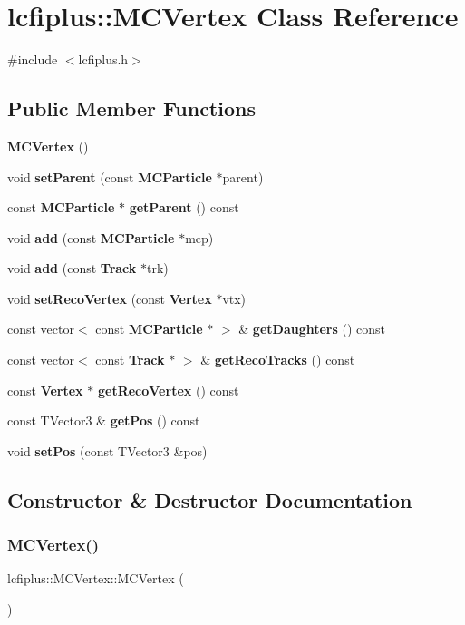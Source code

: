 \section{lcfiplus\+:\+:M\+C\+Vertex Class Reference}
\label{classlcfiplus_1_1MCVertex}


{\ttfamily \#include $<$lcfiplus.\+h$>$}

\subsection*{Public Member Functions}
\begin{DoxyCompactItemize}
\item 
\textbf{ M\+C\+Vertex} ()
\item 
void \textbf{ set\+Parent} (const \textbf{ M\+C\+Particle} $\ast$parent)
\item 
const \textbf{ M\+C\+Particle} $\ast$ \textbf{ get\+Parent} () const
\item 
void \textbf{ add} (const \textbf{ M\+C\+Particle} $\ast$mcp)
\item 
void \textbf{ add} (const \textbf{ Track} $\ast$trk)
\item 
void \textbf{ set\+Reco\+Vertex} (const \textbf{ Vertex} $\ast$vtx)
\item 
const vector$<$ const \textbf{ M\+C\+Particle} $\ast$ $>$ \& \textbf{ get\+Daughters} () const
\item 
const vector$<$ const \textbf{ Track} $\ast$ $>$ \& \textbf{ get\+Reco\+Tracks} () const
\item 
const \textbf{ Vertex} $\ast$ \textbf{ get\+Reco\+Vertex} () const
\item 
const T\+Vector3 \& \textbf{ get\+Pos} () const
\item 
void \textbf{ set\+Pos} (const T\+Vector3 \&pos)
\end{DoxyCompactItemize}


\subsection{Constructor \& Destructor Documentation}
\mbox{\label{classlcfiplus_1_1MCVertex_afdda54c20f1759eb4d914ffea108c738}} 
\subsubsection{M\+C\+Vertex()}
{\footnotesize\ttfamily lcfiplus\+::\+M\+C\+Vertex\+::\+M\+C\+Vertex (\begin{DoxyParamCaption}{ }\end{DoxyParamCaption})\hspace{0.3cm}{\ttfamily [inline]}}



